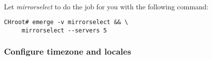 \documentclass[10pt,a4paper]{article}
\begin{document}
\begin{itemize}

                    
                        \paragraph{} Let \textit{mirrorselect} to do the job for you with the following command:
                    
\begin{lstlisting}[style=BashInputCHRoot]
 CHroot# emerge -v mirrorselect && \
     mirrorselect --servers 5
\end{lstlisting}            
        
                \end{itemize}
            
            \newpage
            \subsubsection{Configure timezone and locales}
            
\end{document}
